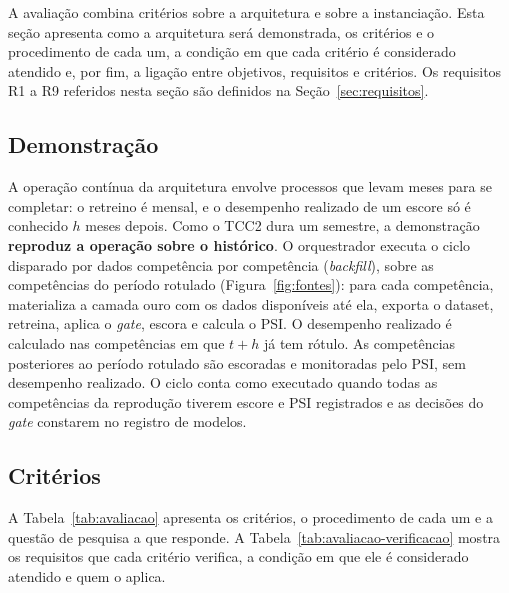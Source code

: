 A avaliação combina critérios sobre a arquitetura e sobre a instanciação. Esta seção apresenta como a arquitetura será demonstrada, os critérios e o procedimento de cada um, a condição em que cada critério é considerado atendido e, por fim, a ligação entre objetivos, requisitos e critérios. Os requisitos R1 a R9 referidos nesta seção são definidos na Seção~\ref{sec:requisitos}.

\subsection{Demonstração}

A operação contínua da arquitetura envolve processos que levam meses para se completar: o retreino é mensal, e o desempenho realizado de um escore só é conhecido $h$ meses depois. Como o TCC2 dura um semestre, a demonstração \textbf{reproduz a operação sobre o histórico}. O orquestrador executa o ciclo disparado por dados competência por competência (\textit{backfill}), sobre as competências do período rotulado (Figura~\ref{fig:fontes}): para cada competência, materializa a camada ouro com os dados disponíveis até ela, exporta o dataset, retreina, aplica o \textit{gate}, escora e calcula o PSI. O desempenho realizado é calculado nas competências em que $t+h$ já tem rótulo. As competências posteriores ao período rotulado são escoradas e monitoradas pelo PSI, sem desempenho realizado. O ciclo conta como executado quando todas as competências da reprodução tiverem escore e PSI registrados e as decisões do \textit{gate} constarem no registro de modelos.

\subsection{Critérios}

A Tabela~\ref{tab:avaliacao} apresenta os critérios, o procedimento de cada um e a questão de pesquisa a que responde. A Tabela~\ref{tab:avaliacao-verificacao} mostra os requisitos que cada critério verifica, a condição em que ele é considerado atendido e quem o aplica.

